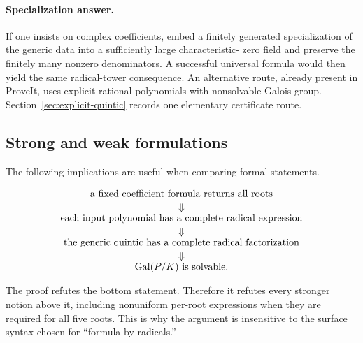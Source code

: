 \paragraph{Specialization answer.}
If one insists on complex coefficients, embed a finitely generated
specialization of the generic data into a sufficiently large characteristic-
zero field and preserve the finitely many nonzero denominators.  A successful
universal formula would then yield the same radical-tower consequence.  An
alternative route, already present in ProveIt, uses explicit rational
polynomials with nonsolvable Galois group.  Section~\ref{sec:explicit-quintic}
records one elementary certificate route.

\subsection{Strong and weak formulations}

The following implications are useful when comparing formal statements.

\[
\begin{array}{c}
\text{a fixed coefficient formula returns all roots}\\[0.2em]
\Downarrow\\[-0.1em]
\text{each input polynomial has a complete radical expression}\\[0.2em]
\Downarrow\\[-0.1em]
\text{the generic quintic has a complete radical factorization}\\[0.2em]
\Downarrow\\[-0.1em]
\operatorname{Gal}(P/K)\text{ is solvable}.
\end{array}
\]

The proof refutes the bottom statement.  Therefore it refutes every stronger
notion above it, including nonuniform per-root expressions when they are
required for all five roots.  This is why the argument is insensitive to the
surface syntax chosen for ``formula by radicals.''
